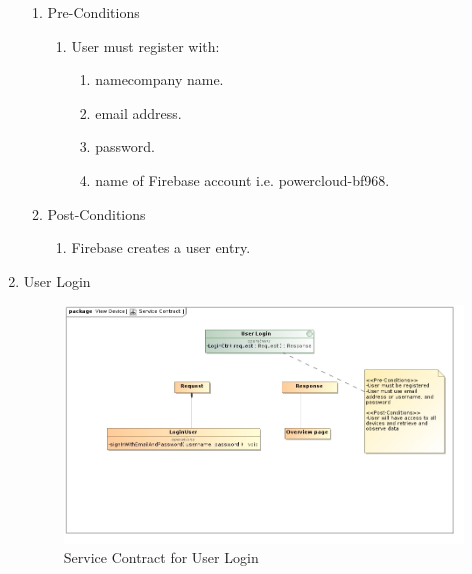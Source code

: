 \documentclass{article}
\begin{document}
\begin{enumerate}
		\begin{enumerate}
			\item  Pre-Conditions
			\begin{enumerate}
				\item	User must register with:
				\begin{enumerate}
					\item	namecompany name.
					\item	email address.
					\item	password.
					\item	name of Firebase account i.e. powercloud-bf968.
				\end{enumerate}
			\end{enumerate}
			\item  Post-Conditions		
			\begin{enumerate}
				\item	Firebase creates a user entry.
			\end{enumerate}
		\end{enumerate}
		\newpage
		\item	User Login
		
		\begin{figure}[H]
			\includegraphics[width=\textwidth]{images/LoginServiceContract.jpg}
			\caption{Service Contract for User Login \label{overflow}}
		\end{figure}
		

\end{enumerate}
\end{document}

